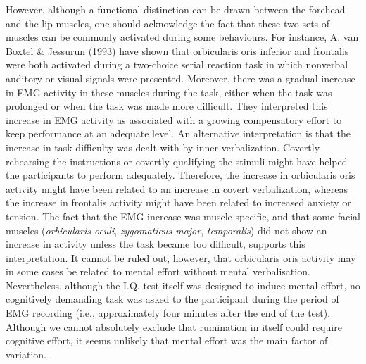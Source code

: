 \documentclass[a4paper,12pt,twoside,openright,oldfontcommands]{memoir}
\begin{document}
However, although a functional distinction can be drawn between the
forehead and the lip muscles, one should acknowledge the fact that these
two sets of muscles can be commonly activated during some behaviours.
For instance, A. van Boxtel \& Jessurun
(\protect\hyperlink{ref-van_boxtel_amplitude_1993}{1993}) have shown
that orbicularis oris inferior and frontalis were both activated during
a two-choice serial reaction task in which nonverbal auditory or visual
signals were presented. Moreover, there was a gradual increase in EMG
activity in these muscles during the task, either when the task was
prolonged or when the task was made more difficult. They interpreted
this increase in EMG activity as associated with a growing compensatory
effort to keep performance at an adequate level. An alternative
interpretation is that the increase in task difficulty was dealt with by
inner verbalization. Covertly rehearsing the instructions or covertly
qualifying the stimuli might have helped the participants to perform
adequately. Therefore, the increase in orbicularis oris activity might
have been related to an increase in covert verbalization, whereas the
increase in frontalis activity might have been related to increased
anxiety or tension. The fact that the EMG increase was muscle specific,
and that some facial muscles (\emph{orbicularis oculi},
\emph{zygomaticus major}, \emph{temporalis}) did not show an increase in
activity unless the task became too difficult, supports this
interpretation. It cannot be ruled out, however, that orbicularis oris
activity may in some cases be related to mental effort without mental
verbalisation. Nevertheless, although the I.Q. test itself was designed
to induce mental effort, no cognitively demanding task was asked to the
participant during the period of EMG recording (i.e., approximately four
minutes after the end of the test). Although we cannot absolutely
exclude that rumination in itself could require cognitive effort, it
seems unlikely that mental effort was the main factor of variation.
\end{document}

